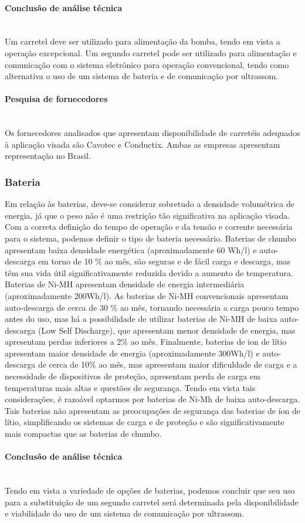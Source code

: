\paragraph{Conclusão de análise técnica}\mbox{}\\
 
Um carretel deve ser utilizado para alimentação da bomba, tendo em vista a operação excepcional. Um segundo carretel pode ser utilizado para alimentação e comunicação com o sistema eletrônico para operação convencional, tendo como alternativa o uso de um sistema de bateria e de comunicação por ultrassom.
 
\paragraph{Pesquisa de fornecedores}\mbox{}\\
Os fornecedores analisados que apresentam disponibilidade de carretéis adequados à aplicação visada são Cavotec e Conductix. Ambas as empresas apresentam representação no Brasil.
 
 
\subsubsection{Bateria}
 
Em relação às baterias, deve-se considerar sobretudo a densidade volumétrica de energia, já que o peso não é uma restrição tão significativa na aplicação visada.
Com a correta definição do tempo de operação e da tensão e corrente necessária para o sistema, podemos definir o tipo de bateria necessário.
Baterias de chumbo apresentam baixa densidade energética (aproximadamente 60 Wh/l) e auto-descarga em torno de 10 \% ao mês, são seguras e de fácil carga e descarga, mas têm sua vida útil significativamente reduzida devido a aumento de temperatura. Baterias de Ni-MH apresentam densidade de energia intermediária (aproximadamente 200Wh/l). As baterias de Ni-MH convencionais apresentam auto-descarga de cerca de 30 \% ao mês, tornando necessária a carga pouco tempo antes do uso, mas há a possibilidade de utilizar baterias de Ni-MH de baixa auto-descarga (Low Self Discharge), que apresentam menor densidade de energia, mas apresentam perdas inferiores a 2\% ao mês.
Finalmente, baterias de ion de lítio apresentam maior densidade de energia (aproximadamente 300Wh/l) e auto-descarga de cerca de 10\% ao mês, mas apresentam maior dificuldade de carga e a necessidade de dispositivos de proteção, apresentam perda de carga em temperaturas mais altas e questões de segurança.
Tendo em vista tais considerações, é razoável optarmos por baterias de Ni-Mh de baixa auto-descarga. Tais baterias não apresentam as preocupações de segurança das baterias de íon de lítio, simplificando os sistemas de carga e de proteção e são significativamente mais compactas que as baterias de chumbo.
\paragraph{Conclusão de análise técnica}\mbox{}\\
Tendo em vista a variedade de opções de baterias, podemos concluir que seu uso para a substituição de um segundo carretel será determinada pela disponibilidade e viabilidade do uso de um sistema de comunicação por ultrassom.